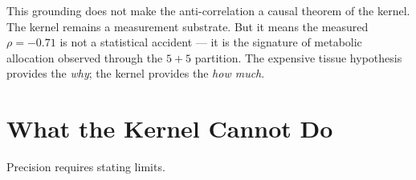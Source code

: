 \documentclass[
  aps,
  prd,
  twocolumn,
  superscriptaddress,
  nofootinbib,
  floatfix
]{revtex4-2}
\begin{document}
This grounding does not make the anti-correlation a
causal theorem of the kernel.  The kernel remains a
measurement substrate.  But it means the measured
$\rho = -0.71$ is not a statistical accident --- it is
the signature of metabolic allocation observed through
the $5\!+\!5$ partition.  The expensive tissue hypothesis
provides the \emph{why}; the kernel provides the
\emph{how much}.

\section{What the Kernel Cannot Do}\label{sec:limits}

Precision requires stating limits.
\end{document}
